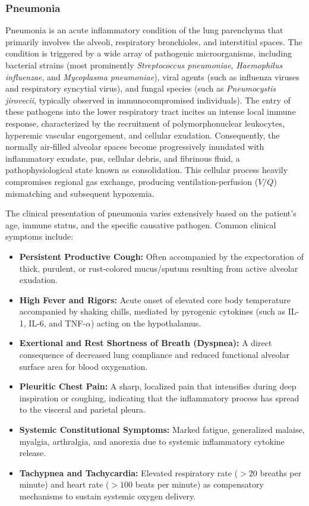 \subsubsection{Pneumonia}

Pneumonia is an acute inflammatory condition of the lung parenchyma that primarily involves the alveoli, respiratory bronchioles, and interstitial spaces. The condition is triggered by a wide array of pathogenic microorganisms, including bacterial strains (most prominently \textit{Streptococcus pneumoniae}, \textit{Haemophilus influenzae}, and \textit{Mycoplasma pneumoniae}), viral agents (such as influenza viruses and respiratory syncytial virus), and fungal species (such as \textit{Pneumocystis jirovecii}, typically observed in immunocompromised individuals). The entry of these pathogens into the lower respiratory tract incites an intense local immune response, characterized by the recruitment of polymorphonuclear leukocytes, hyperemic vascular engorgement, and cellular exudation. Consequently, the normally air-filled alveolar spaces become progressively inundated with inflammatory exudate, pus, cellular debris, and fibrinous fluid, a pathophysiological state known as consolidation. This cellular process heavily compromises regional gas exchange, producing ventilation-perfusion ($V/Q$) mismatching and subsequent hypoxemia.

The clinical presentation of pneumonia varies extensively based on the patient's age, immune status, and the specific causative pathogen. Common clinical symptoms include:

\begin{itemize}
	\item \textbf{Persistent Productive Cough:} Often accompanied by the expectoration of thick, purulent, or rust-colored mucus/sputum resulting from active alveolar exudation.
	\item \textbf{High Fever and Rigors:} Acute onset of elevated core body temperature accompanied by shaking chills, mediated by pyrogenic cytokines (such as IL-1, IL-6, and TNF-$\alpha$) acting on the hypothalamus.
	\item \textbf{Exertional and Rest Shortness of Breath (Dyspnea):} A direct consequence of decreased lung compliance and reduced functional alveolar surface area for blood oxygenation.
	\item \textbf{Pleuritic Chest Pain:} A sharp, localized pain that intensifies during deep inspiration or coughing, indicating that the inflammatory process has spread to the visceral and parietal pleura.
	\item \textbf{Systemic Constitutional Symptoms:} Marked fatigue, generalized malaise, myalgia, arthralgia, and anorexia due to systemic inflammatory cytokine release.
	\item \textbf{Tachypnea and Tachycardia:} Elevated respiratory rate ($>20$ breaths per minute) and heart rate ($>100$ beats per minute) as compensatory mechanisms to sustain systemic oxygen delivery.
\end{itemize}

